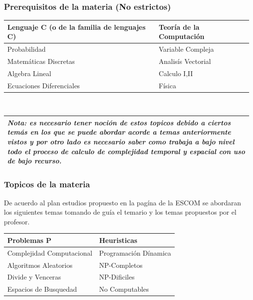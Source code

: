 \documentclass[10pt,executivepaper]{article}
\begin{document}
\subsubsection{Prerequisitos de la materia (No estrictos)}
\begin{center}
	\begin{tabular}{|p{5.5cm}|p{5.5cm}|}
		\hline
		Lenguaje C (o de la familia de lenguajes C) &	 Teoría de la Computación \\
		\hline
		Probabilidad &  Variable Compleja \\
		\hline
		Matemáticas Discretas &  Analisís Vectorial \\
		\hline
		Algebra Lineal &  Calculo I,II \\
		\hline
		Ecuaciones Diferenciales & Física \\
		\hline
	\end{tabular}
	\\\vspace{2.5mm}
	\begin{tabular}{|p{13cm}|}
		\hline
		\textit{Nota: es necesario tener noción de estos topicos debido
		a ciertos temás en los que se puede abordar acorde a temas anteriormente
		vistos y por otro lado es necesario saber como trabaja a bajo nivel todo
		el proceso de calculo de complejidad temporal y espacial con uso de bajo recurso.}\\
		\hline
	\end{tabular}
\end{center}
\subsubsection{Topicos de la materia}
De acuerdo al plan estudios propuesto en la pagína de la ESCOM se abordaran los siguientes temas tomando de guía el temario y los temas propuestos por el profesor.
\begin{center}
	\begin{tabular}{|p{5.5cm}|p{5.5cm}|}
		\hline
		Problemas P & Heuristicas\\
		\hline
		Complejidad Computacional & Programación Dínamica \\
		\hline
		Algoritmos Aleatorios & NP-Completos \\
		\hline
		Divide y Venceras & NP-Dificiles\\
		\hline
		Espacios de Busquedad & No Computables \\
		\hline
	\end{tabular}
\end{center}
\end{document}
